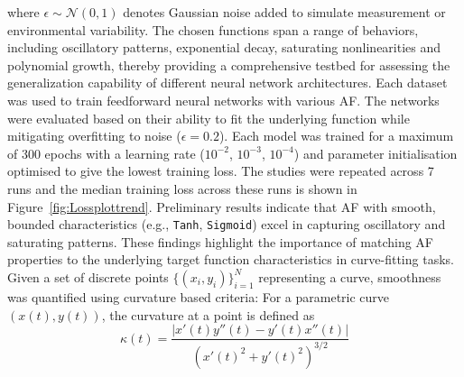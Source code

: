 \documentclass[11pt]{article}
\begin{document}
where $\epsilon \sim \mathcal{N}(0,1)$ denotes Gaussian noise added to simulate measurement 
or environmental variability. The chosen functions span a range of behaviors, 
including oscillatory patterns, exponential decay, saturating nonlinearities 
and polynomial growth, thereby providing a comprehensive testbed for assessing the 
generalization capability of different neural network architectures.
Each dataset was used to train feedforward neural networks with various AF. 
The networks were evaluated based on their ability to fit the underlying 
function while mitigating overfitting to noise ($\epsilon = 0.2$). Each model was trained for 
a maximum of 300 epochs with a learning rate ($10^{-2}$, $10^{-3}$, $10^{-4}$) and parameter initialisation 
optimised to give the lowest training loss.
The studies were repeated across 7 runs
and the median training loss across these runs is shown in 
Figure~\ref{fig:Lossplottrend}.
Preliminary results indicate that AF with smooth, bounded characteristics 
(e.g., \texttt{Tanh}, \texttt{Sigmoid}) excel in capturing oscillatory 
and saturating patterns.
These findings highlight the importance of matching AF properties 
to the underlying target function characteristics in curve-fitting tasks.
Given a set of discrete points $\{(x_i, y_i)\}_{i=1}^N$ representing a curve, 
smoothness was quantified using curvature based criteria:
For a parametric curve $(x(t), y(t))$, the curvature at a point is defined as
\begin{equation}
\kappa(t) = \frac{|x'(t)y''(t) - y'(t)x''(t)|}{\left( x'(t)^2 + y'(t)^2 \right)^{3/2}}
\end{equation}
\end{document}
